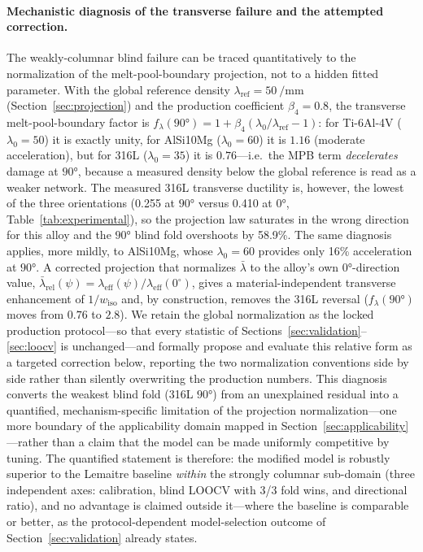 \documentclass[twocolumn]{sagej}
\begin{document}
\paragraph{Mechanistic diagnosis of the transverse failure and the attempted correction.}
The weakly-columnar blind failure can be traced quantitatively to the normalization of the melt-pool-boundary projection, not to a hidden fitted parameter. With the global reference density $\lambda_{\mathrm{ref}} = \SI{50}{\per\milli\meter}$ (Section~\ref{sec:projection}) and the production coefficient $\beta_4 = 0.8$, the transverse melt-pool-boundary factor is $f_\lambda(\ang{90}) = 1 + \beta_4(\lambda_0/\lambda_{\mathrm{ref}}-1)$: for Ti-6Al-4V ($\lambda_0 = 50$) it is exactly unity, for AlSi10Mg ($\lambda_0 = 60$) it is $1.16$ (moderate acceleration), but for 316L ($\lambda_0 = 35$) it is $0.76$---i.e.\ the MPB term \emph{decelerates} damage at $\ang{90}$, because a measured density below the global reference is read as a weaker network. The measured 316L transverse ductility is, however, the lowest of the three orientations (0.255 at $\ang{90}$ versus 0.410 at $\ang{0}$, Table~\ref{tab:experimental}), so the projection law saturates in the wrong direction for this alloy and the $\ang{90}$ blind fold overshoots by 58.9\%. The same diagnosis applies, more mildly, to AlSi10Mg, whose $\lambda_0 = 60$ provides only 16\% acceleration at $\ang{90}$. A corrected projection that normalizes $\bar\lambda$ to the alloy's own $\ang{0}$-direction value, $\bar\lambda_{\mathrm{rel}}(\psi) = \lambda_{\mathrm{eff}}(\psi)/\lambda_{\mathrm{eff}}(0^\circ)$, gives a material-independent transverse enhancement of $1/w_{\mathrm{iso}}$ and, by construction, removes the 316L reversal ($f_\lambda(\ang{90})$ moves from $0.76$ to $2.8$). We retain the global normalization as the locked production protocol---so that every statistic of Sections~\ref{sec:validation}--\ref{sec:loocv} is unchanged---and formally propose and evaluate this relative form as a targeted correction below, reporting the two normalization conventions side by side rather than silently overwriting the production numbers. This diagnosis converts the weakest blind fold (316L $\ang{90}$) from an unexplained residual into a quantified, mechanism-specific limitation of the projection normalization---one more boundary of the applicability domain mapped in Section~\ref{sec:applicability}---rather than a claim that the model can be made uniformly competitive by tuning. The quantified statement is therefore: the modified model is robustly superior to the Lemaitre baseline \emph{within} the strongly columnar sub-domain (three independent axes: calibration, blind LOOCV with 3/3 fold wins, and directional ratio), and no advantage is claimed outside it---where the baseline is comparable or better, as the protocol-dependent model-selection outcome of Section~\ref{sec:validation} already states.
\end{document}
